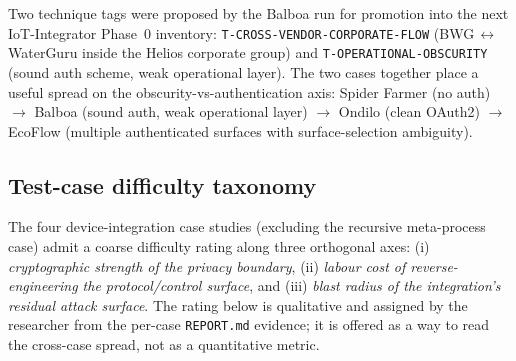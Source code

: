 \documentclass[11pt,a4paper]{article}
\begin{document}
Two technique tags were proposed by the Balboa run for promotion into
the next IoT-Integrator Phase~0 inventory:
\texttt{T-CROSS-VENDOR-CORPORATE-FLOW} (BWG\,$\leftrightarrow$\,WaterGuru
inside the Helios corporate group) and \texttt{T-OPERATIONAL-OBSCURITY}
(sound auth scheme, weak operational layer). The two cases together
place a useful spread on the obscurity-vs-authentication axis:
Spider Farmer (no auth) $\to$ Balboa (sound auth, weak operational
layer) $\to$ Ondilo (clean OAuth2) $\to$ EcoFlow (multiple
authenticated surfaces with surface-selection ambiguity).

\subsection{Test-case difficulty taxonomy}
\label{sec:synthesis-difficulty}
The four device-integration case studies (excluding the recursive
meta-process case) admit a coarse difficulty rating along three
orthogonal axes: (i) \emph{cryptographic strength of the privacy
boundary}, (ii) \emph{labour cost of reverse-engineering the
protocol/control surface}, and (iii) \emph{blast radius of the
integration's residual attack surface}. The rating below is qualitative
and assigned by the researcher from the per-case \texttt{REPORT.md}
evidence; it is offered as a way to read the cross-case spread, not as
a quantitative metric.
\end{document}
